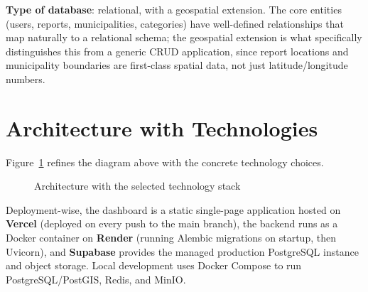 \textbf{Type of database}: relational, with a geospatial extension. The core entities (users, reports, municipalities, categories) have well-defined relationships that map naturally to a relational schema; the geospatial extension is what specifically distinguishes this from a generic CRUD application, since report locations and municipality boundaries are first-class spatial data, not just latitude/longitude numbers.

\section{Architecture with Technologies}

Figure~\ref{fig:arch-tech} refines the diagram above with the concrete technology choices.

\begin{figure}[h!]
\centering
{}
\caption{Architecture with the selected technology stack}
\label{fig:arch-tech}
\end{figure}

Deployment-wise, the dashboard is a static single-page application hosted on \textbf{Vercel} (deployed on every push to the main branch), the backend runs as a Docker container on \textbf{Render} (running Alembic migrations on startup, then Uvicorn), and \textbf{Supabase} provides the managed production PostgreSQL instance and object storage. Local development uses Docker Compose to run PostgreSQL/PostGIS, Redis, and MinIO.

